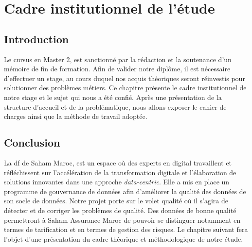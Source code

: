 \chapter{Cadre institutionnel de l'\'etude }
\section*{Introduction}
Le cursus en Master 2, est sanctionn\'e par la r\'edaction et la soutenance d'un m\'emoire de fin de formation. Afin de valider notre dipl\^ome, il est n\'ecessaire d'effectuer un stage, au cours duquel nos acquis th\'eoriques seront r\'einvestis pour solutionner des probl\`emes m\'etiers. Ce chapitre pr\'esente le cadre institutionnel de notre stage et le sujet qui nous a \'et\'e confi\'e. Apr\`es une pr\'esentation de la structure d'accueil et de la probl\'ematique, nous allons exposer le cahier de charges ainsi que la m\'ethode de travail adopt\'ee.


%
%

\section*{Conclusion}
La \acrlong{df} de Saham Maroc, est un espace où des experts en digital travaillent et réfléchissent sur l’accélération de la transformation digitale et l’élaboration de solutions innovantes dans une approche \textit{data-centric}. Elle a mis en place un programme de gouvernance de donn\'ees afin d'am\'eliorer la qualit\'e des donn\'ees de son socle de donn\'ees. Notre projet porte sur le volet qualit\'e o\`u il s'agira de d\'etecter et de corriger les probl\`emes de qualit\'e. Des donn\'ees de bonne qualit\'e permettront \`a Saham Assurance Maroc de pouvoir se distinguer notamment en termes de tarification et en termes de gestion des risques. Le chapitre suivant fera l'objet d'une pr\'esentation du cadre th\'eorique et m\'ethodologique de notre \'etude.